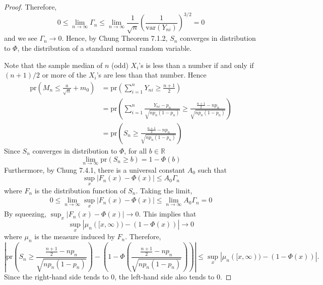 \documentclass[letterpaper, 12pt]{article}
\newcommand{\pr}{\text{pr}}
\newcommand{\R}{\mathbb{R}}
\newcommand{\var}{\text{var}}
\newcommand{\sion}{\sum_{i=1}^n}
\begin{document}
\begin{proof}
Therefore, 
\[
0 \leq \lim_{n \to \infty} \Gamma_n \leq \lim_{n \to \infty} \frac{1}{\sqrt{n}} \left( \frac{1}{\var(Y_{ni})} \right)^{3/2} = 0
\]
and we see $\Gamma_n \to 0$. Hence, by Chung Theorem 7.1.2, $S_n$ converges in distribution to $\Phi$, the distribution of a standard normal random variable.

Note that the sample median of $n$ (odd) $X_i$'s is less than a number if and only if $(n+1)/2$ or more of the $X_i$'s are less than that number. Hence
\begin{align*}
\pr\left(M_n \leq  \frac{a}{\sqrt{n}} + m_0\right)
&=
\pr\left(
\sion Y_{ni} \geq \frac{n+1}{2}
\right) 
\\
&=
\pr\left(\sion \frac{Y_{ni} - p_n}{\sqrt{n p_n(1-p_n)}} 
\geq
\frac{\frac{n+1}{2} - n p_n}{\sqrt{n p_n(1-p_n)}}
\right)
\\
&=
\pr\left(
S_n \geq \frac{\frac{n+1}{2} - n p_n}{\sqrt{n p_n(1-p_n)}}
\right)
\end{align*}
Since $S_n$ converges in distribution to $\Phi$, for all $b \in \R$
\[
\lim_{n \to \infty} \pr\left(
S_n \geq b
\right)
=
1 - \Phi(b)
\]
Furthermore, by Chung 7.4.1, there is a universal constant $A_0$ such that
\[
\sup_x |F_n(x) - \Phi(x)| \leq A_0 \Gamma_n
\]
where $F_n$ is the distribution function of $S_n$. Taking the limit,
\begin{align*}
0 
\leq 
\lim_{n \to \infty} 
\sup_x |F_n(x) - \Phi(x)| 
\leq 
\lim_{n \to \infty}
A_0 \Gamma_n = 0
\end{align*}
By squeezing, $\sup_x |F_n(x) - \Phi(x)|  \to 0$. 
This implies that 
\[
\sup_x |\mu_n([x, \infty)) - (1-\Phi(x))| \to 0
\]
where $\mu_n$ is the measure induced by $F_n$. Therefore,
\begin{equation}
\left|
\pr
\left(
S_n 
\geq 
\frac{\frac{n+1}{2} - n p_n}{\sqrt{n p_n(1-p_n)}}
\right)
-
\left(1 - \Phi
\left(
\frac{\frac{n+1}{2} - n p_n}{\sqrt{n p_n(1-p_n)}}
\right)
\right)
\right|
\leq 
\sup_x |\mu_n([x, \infty)) - (1-\Phi(x))|.
\label{empz}
\end{equation}
Since the right-hand side tends to 0, the left-hand side also tends to 0. 


\end{proof}
\end{document}
